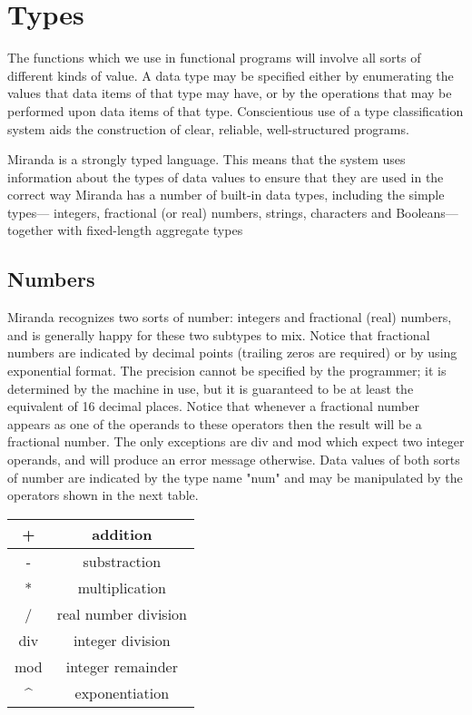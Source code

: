 \documentclass[11pt]{article}
\begin{document}
\section{Types}
The functions which we use in functional programs will involve all sorts of different
kinds of value. A data
type may be specified either by enumerating the values that data items of that
type may have, or by the operations that may be performed upon data items of
that type. Conscientious use of a type classification system aids the construction
of clear, reliable, well-structured programs.

Miranda is a strongly typed language. This means that the system uses information about the types of data values to ensure that they are used in the correct
way
Miranda has a number of built-in data types, including the simple types—
integers, fractional (or real) numbers, strings, characters and Booleans—together
with fixed-length aggregate types

\subsection{Numbers}
Miranda recognizes two sorts of number: integers and fractional (real) numbers,
and is generally happy for these two subtypes to mix. Notice that fractional
numbers are indicated by decimal points (trailing zeros are required) or by using
exponential format. The precision cannot be specified by the programmer; it is
determined by the machine in use, but it is guaranteed to be at least the equivalent
of 16 decimal places.
Notice that whenever a fractional number appears as one of the operands to these operators then the
result will be a fractional number. The only exceptions are div and mod which
expect two integer operands, and will produce an error message otherwise. Data values of both sorts of number are indicated by the type name "num" and may be manipulated by the operators shown in the next
table. 

\begin{center}
\begin{tabular}{ |c|c| } 
 \hline
 + & addition  \\
  \hline
 - & substraction  \\ 
  \hline
 * & multiplication  \\ 
  \hline
 / & real number division  \\ 
  \hline
 div & integer division  \\ 
   \hline
 mod & integer remainder  \\ 
   \hline
   \^{}&  exponentiation  \\ 
\hline
\end{tabular}
\end{center}
\end{document}
